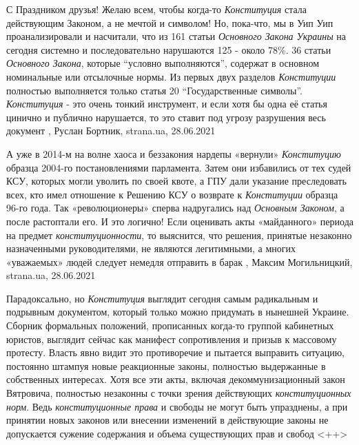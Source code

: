 С Праздником друзья! Желаю всем, чтобы когда-то \emph{Конституция} стала действующим
Законом, а не мечтой и символом!  Но, пока-что, мы в Уип Уип проанализировали и
насчитали, что из 161 статьи \emph{Основного Закона Украины} на сегодня системно и
последовательно нарушаются 125 - около 78\%. 36 статьи \emph{Основного Закона},
которые \enquote{условно выполняются}, содержат в основном номинальные или отсылочные
нормы. Из первых двух разделов \emph{Конституции} полностью выполняется только статья
20 \enquote{Государственные символы}.  \emph{Конституция} - это очень тонкий инструмент, и
если хотя бы одна её статья цинично и публично нарушается, то это ставит под
угрозу разрушения весь документ
,
Руслан Бортник, strana.ua, 28.06.2021

А уже в 2014-м на волне хаоса и беззакония нардепы «вернули» \emph{Конституцию}
образца 2004-го постановлениями парламента. Затем они избавились от тех судей
КСУ, которых могли уволить по своей квоте, а ГПУ дали указание преследовать
всех, кто имел отношение к Решению КСУ о возврате к \emph{Конституции} образца 96-го
года.  Так «революционеры» сперва надругались над \emph{Основным Законом}, а после
растоптали его. И это логично! Если оценивать акты «майданного» периода на
предмет \emph{конституционности}, то выяснится, что решения, принятые незаконно
назначенными руководителями, не являются легитимными, а многих «уважаемых»
людей следует немедля отправить в барак
, 
Максим Могильницкий, strana.ua, 28.06.2021



Парадоксально, но \emph{Конституция} выглядит сегодня самым радикальным и подрывным
документом, который только можно придумать в нынешней Украине. Сборник
формальных положений, прописанных когда-то группой кабинетных юристов, выглядит
сейчас как манифест сопротивления и призыв к массовому протесту. Власть явно
видит это противоречие и пытается выправить ситуацию, постоянно штампуя новые
реакционные законы, полностью выдержанные в собственных интересах.  Хотя все
эти акты, включая декоммунизационный закон Вятровича, полностью незаконны с
точки зрения действующих \emph{конституционных норм}. Ведь \emph{конституционные права} и
свободы не могут быть упразднены, а при принятии новых законов или внесении
изменений в действующие законы не допускается сужение содержания и объема
существующих прав и свобод
  <++>

